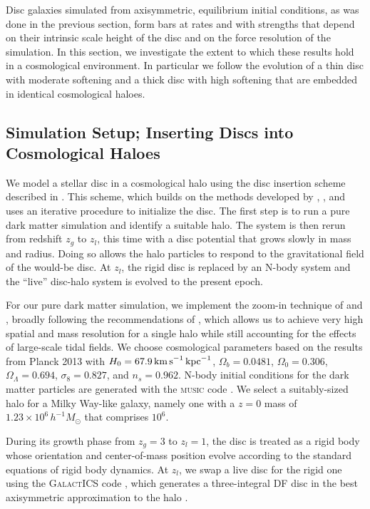 Disc galaxies simulated from axisymmetric, equilibrium initial
conditions, as was done in the previous section, form bars at rates
and with strengths that depend on their intrinsic scale height of the
disc and on the force resolution of the simulation. In this section,
we investigate the extent to which these results hold in a
cosmological environment.  In particular we follow the evolution of a
thin disc with moderate softening and a thick disc with high softening
that are embedded in identical cosmological haloes.

\subsection{Simulation Setup; Inserting Discs into Cosmological Haloes}

We model a stellar disc in a cosmological halo using the disc
insertion scheme described in \citet{Bauer2018a}.  This scheme, which
builds on the methods developed by
\citet{BerentzenShlosmanStellarDisks}, \citet{DeBuhrStellarDisks}, and
\citet{YurinSpringelStellarDisks} uses an iterative procedure to
initialize the disc.  The first step is to run a pure dark matter
simulation and identify a suitable halo.  The system is then rerun
from redshift $z_g$ to $z_l$, this time with a disc potential that
grows slowly in mass and radius.  Doing so allows the halo particles
to respond to the gravitational field of the would-be disc.  At $z_l$,
the rigid disc is replaced by an N-body system and the ``live'' disc-halo
system is evolved to the present epoch.

For our pure dark matter simulation, we implement the zoom-in
technique of \citet{KatzQuasarZoom} and \citet{NavarroWhiteZoom},
broadly following the recommendations of \cite{onorbe_etal_2014},
which allows us to achieve very high spatial and mass resolution for a
single halo while still accounting for the effects of large-scale
tidal fields.  We choose cosmological parameters based on the results
from Planck 2013 \citep{planck_2014} with $H_0=67.9\,{\rm
  km\,s}^{-1}\,{\rm kpc}^{-1}$, $\Omega_b = 0.0481$, $\Omega_0 =
0.306$, $\Omega_\Lambda = 0.694$, $\sigma_8 = 0.827$, and $n_s =
0.962$.  N-body initial conditions for the dark matter particles are
generated with the \textsc{music} code \citep{music}.  
We select a suitably-sized halo for a Milky Way-like galaxy, namely
one with a $z=0$ mass of $1.23\times 10^6\,h^{-1} M_\odot$
that comprises $10^6$.

During its growth phase from $z_g=3$ to $z_l=1$, the disc is treated
as a rigid body whose orientation and center-of-mass position evolve
according to the standard equations of rigid body dynamics.  At
$z_l$, we swap a live disc for the rigid one using the
\textsc{GalactICS} code
\citep{KGGalactICSReference,WPDGalactICSReference}, which generates a
three-integral DF disc in the best axisymmetric approximation to the
halo \citet{Bauer2018a}.

